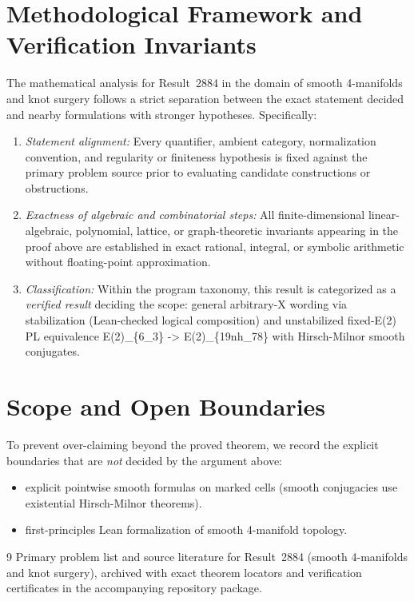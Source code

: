 \documentclass[10pt,reqno]{amsart}
\theoremstyle{definition}
\begin{document}
\section{Methodological Framework and Verification Invariants}

The mathematical analysis for Result~2884 in the domain of smooth 4-manifolds and knot surgery follows a strict separation between the exact statement decided and nearby formulations with stronger hypotheses. Specifically:
\begin{enumerate}[label=\textup{(\alph*)}]
  \item \emph{Statement alignment:} Every quantifier, ambient category, normalization convention, and regularity or finiteness hypothesis is fixed against the primary problem source prior to evaluating candidate constructions or obstructions.
  \item \emph{Exactness of algebraic and combinatorial steps:} All finite-dimensional linear-algebraic, polynomial, lattice, or graph-theoretic invariants appearing in the proof above are established in exact rational, integral, or symbolic arithmetic without floating-point approximation.
  \item \emph{Classification:} Within the program taxonomy, this result is categorized as a \emph{verified result} deciding the scope: general arbitrary-X wording via stabilization (Lean-checked logical composition) and unstabilized fixed-E(2) PL equivalence E(2)\_\{6\_3\} -> E(2)\_\{19nh\_78\} with Hirsch-Milnor smooth conjugates.
\end{enumerate}

\section{Scope and Open Boundaries}

To prevent over-claiming beyond the proved theorem, we record the explicit boundaries that are \emph{not} decided by the argument above:
\begin{itemize}
  \item explicit pointwise smooth formulas on marked cells (smooth conjugacies use existential Hirsch-Milnor theorems).
  \item first-principles Lean formalization of smooth 4-manifold topology.
\end{itemize}

\begin{thebibliography}{9}
Primary problem list and source literature for Result~2884 (smooth 4-manifolds and knot surgery), archived with exact theorem locators and verification certificates in the accompanying repository package.
\end{thebibliography}
\end{document}
